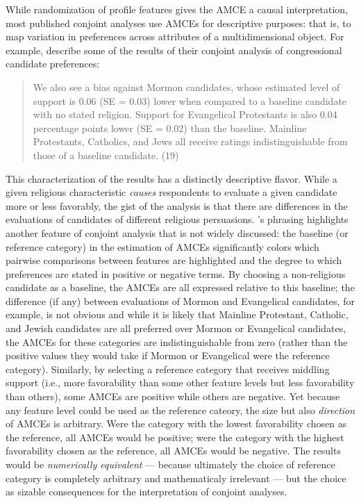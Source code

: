 \documentclass[a4paper,12pt]{article}\usepackage[]{graphicx}\usepackage[]{color}
\begin{document}
While randomization of profile features gives the AMCE a causal interpretation, most published conjoint analyses use AMCEs for descriptive purposes: that is, to map variation in preferences across attributes of a multidimensional object. For example, \citet{HainmuellerHopkinsYamamoto2014} describe some of the results of their conjoint analysis of congressional candidate preferences:

\begin{quote}
We also see a bias against Mormon candidates, whose estimated level of support is 0.06 (SE = 0.03) lower when compared to a baseline candidate with no stated religion. Support for Evangelical Protestants is also 0.04 percentage points lower (SE = 0.02) than the baseline. Mainline Protestants, Catholics, and Jews all receive ratings indistinguishable from those of a baseline candidate. (19)
\end{quote}

This characterization of the results has a distinctly descriptive flavor. While a given religious characteristic \textit{causes} respondents to evaluate a given candidate more or less favorably, the gist of the analysis is that there are differences in the evaluations of candidates of different religious persuasions. \citeauthor{HainmuellerHopkinsYamamoto2014}'s phrasing highlights another feature of conjoint analysis that is not widely discussed: the baseline (or reference category) in the estimation of AMCEs significantly colors which pairwise comparisons between features are highlighted and the degree to which preferences are stated in positive or negative terms. By choosing a non-religious candidate as a baseline, the AMCEs are all expressed relative to this baseline; the difference (if any) between evaluations of Mormon and Evangelical candidates, for example, is not obvious and while it is likely that Mainline Protestant, Catholic, and Jewish candidates are all preferred over Mormon or Evangelical candidates, the AMCEs for these categories are indistinguishable from zero (rather than the positive values they would take if Mormon or Evangelical were the reference category). Similarly, by selecting a reference category that receives middling support (i.e., more favorability than some other feature levels but less favorability than others), some AMCEs are positive while others are negative. Yet because any feature level could be used as the reference cateory, the size but also \textit{direction} of AMCEs is arbitrary. Were the category with the lowest favorability chosen as the reference, all AMCEs would be positive; were the category with the highest favorability chosen as the reference, all AMCEs would be negative. The results would be \textit{numerically equivalent} --- because ultimately the choice of reference category is completely arbitrary and mathematicaly irrelevant --- but the choice as sizable consequences for the interpretation of conjoint analyses.
\end{document}
